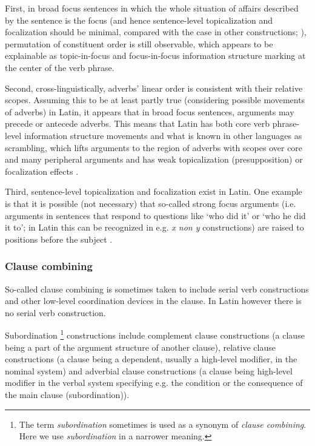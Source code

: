 \documentclass[a4paper, oneside, 12pt]{report}
\newcommand*{\citepage}[1]{p.~{#1}}
\newcommand*{\citepages}[1]{pp.~{#1}}
\newcommand*{\term}[1]{\emph{#1}}
\newcommand{\form}[1]{\emph{#1}}
\newcommand{\translate}[1]{`#1'}
\begin{document}
First, in broad focus sentences in which the whole situation of affairs described by the sentence is the focus
(and hence sentence-level topicalization and focalization should be minimal,
compared with the case in other constructions; \citealt[\citepage{36}]{devine2006latin}),
permutation of constituent order is still observable,
which appears to be explainable as topic-in-focus and focus-in-focus information structure marking at the center of the verb phrase.

Second, cross-linguistically, adverbs' linear order is consistent with their relative scopes.
Assuming this to be at least partly true (considering possible movements of adverbs) in Latin, 
it appears that in broad focus sentences, arguments may precede or antecede adverbs.
This means that Latin has both core verb phrase-level information structure movements \citep[\citepages{36-88}]{devine2006latin}
and what is known in other languages as scrambling,
which lifts arguments to the region of adverbs with scopes over core and many peripheral arguments and has weak topicalization (presupposition) or focalization effects \citep[\citepages{98-112}]{devine2006latin}.

Third, sentence-level topicalization and focalization exist in Latin.
One example is that it is possible (not necessary) that so-called strong focus arguments (i.e. arguments in sentences that respond to questions like \translate{who did it} or \translate{who he did it to}; in Latin this can be recognized in e.g. \form{x non y} constructions) are raised to positions before the subject \citep[\citepages{225-232,302}]{devine2006latin}.

\subsubsection{Clause combining}\label{sec:grammatical.clause.clause-combine}

So-called clause combining is sometimes taken to include serial verb constructions and other low-level coordination devices in the clause.
In Latin however there is no serial verb construction.

Subordination%
\footnote{
    The term \term{subordination} sometimes is used as a synonym of \term{clause combining}.
    Here we use \term{subordination} in a narrower meaning.
} constructions include complement clause constructions (a clause being a part of the argument structure of another clause), relative clause constructions (a clause being a dependent, usually a high-level modifier, in the nominal system) and adverbial clause constructions (a clause being high-level modifier in the verbal system specifying e.g. the condition or the consequence of the main clause (subordination)).
\end{document}
